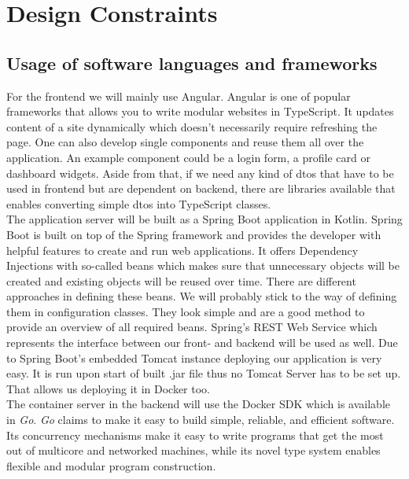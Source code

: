 \documentclass[a4paper,12pt,chapterprefix=false,bibliography=totoc,listof=totoc,]{scrreprt}
\begin{document}
\section{Design Constraints}

\subsection{Usage of software languages and frameworks}
For the frontend we will mainly use Angular. Angular is one of popular frameworks that allows you to write modular websites in TypeScript. It updates content of a site dynamically which doesn't necessarily require refreshing the page. One can also develop single components and reuse them all over the application. An example component could be a login form, a profile card or dashboard widgets. Aside from that, if we need any kind of \gls{dto}s that have to be used in frontend but are dependent on backend, there are libraries available that enables converting simple \gls{dto}s into TypeScript classes. \\

The application server will be built as a Spring Boot application in Kotlin. Spring Boot is built on top of the Spring framework and provides the developer with helpful features to create and run web applications. It offers Dependency Injections with so-called beans which makes sure that unnecessary objects will be created and existing objects will be reused over time. There are different approaches in defining these beans. We will probably stick to the way of defining them in configuration classes. They look simple and are a good method to provide an overview of all required beans. Spring's REST Web Service which represents the interface between our front- and backend will be used as well. Due to Spring Boot's embedded Tomcat instance deploying our application is very easy. It is run upon start of built .jar file thus no Tomcat Server has to be set up. That allows us deploying it in Docker too. \\

The container server in the backend will use the Docker SDK which is available in \emph{Go}. \emph{Go} claims to make it easy to build simple, reliable, and efficient software. Its concurrency mechanisms make it easy to write programs that get the most out of multicore and networked machines, while its novel type system enables flexible and modular program construction.
\end{document}

